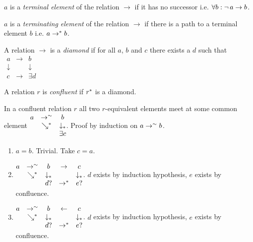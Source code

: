 \begin{definition}
  $a$ is a \emph{terminal element} of the relation $\to$ if it has no
  successor i.e. $\forall b: \neg\, a \to b$.
\end{definition}

\begin{definition}
  $a$ is a \emph{terminating element} of the relation $\to$ if there is a path
  to a terminal element $b$ i.e. $a \to^* b$.
\end{definition}

\begin{definition}
A relation $\to$ is a \emph{diamond} if for all $a$, $b$ and $c$ there exists a $d$
such that
$
  \begin{matrix}
    a & \to & b \\
    \downarrow & & \downarrow \\
    c & \to & \exists d
  \end{matrix}
$
\end{definition}


\begin{definition}
  A relation $r$ is \emph{confluent} if $r^*$ is a diamond.
\end{definition}

\begin{theorem} In a confluent relation $r$ all two $r$-equivalent elements
  meet at some common element
  $
  \begin{matrix}
    a & \to^\sim & b \\
    & \searrow^* & \downarrow_*\\
    & & \exists c
  \end{matrix}
  $.
  Proof by induction on $a\to^\sim b$.
  \begin{enumerate}

  \item $a = b$. Trivial. Take $c = a$.

  \item
    $\begin{matrix}
      a & \to^\sim & b & \to & c\\
      & \searrow^* & \downarrow_*  & & \downarrow_*\\
      & & d? & \to^* & e?
    \end{matrix}$.
    $d$ exists by induction hypothesis, $e$ exists by confluence.

  \item
    $
    \begin{matrix}
      a & \to^\sim & b & \gets & c\\
      & \searrow^* & \downarrow_*  & & \downarrow_*\\
      & & d? & \to^* & e?
    \end{matrix}
    $.
    $d$ exists by induction hypothesis, $e$ exists by confluence.
  \end{enumerate}
\end{theorem}

